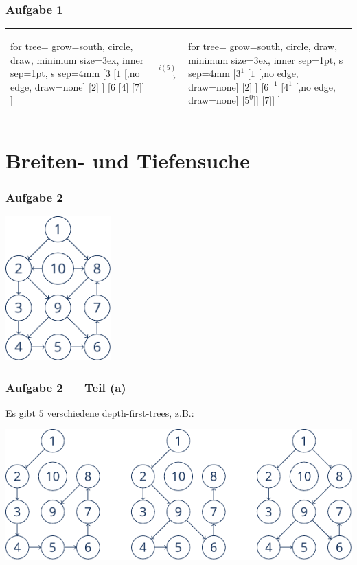\documentclass{beamer}
\begin{document}
\begin{frame} \frametitle{Aufgabe 1}
	\centering
	\begin{tabularx}{\linewidth}{m{3.5cm} m{.5cm} m{3.5cm}}
		\begin{forest}
			for tree={ grow=south, circle, draw, minimum size=3ex, inner sep=1pt, s sep=4mm }
			[$3$ [$1$ [,no edge, draw=none] [$2$] ] [$6$ [$4$] [$7$]] ]
		\end{forest}
		&
		$\overset{i(5)}{\longrightarrow}$
		&
		\begin{forest}
			for tree={ grow=south, circle, draw, minimum size=3ex, inner sep=1pt, s sep=4mm }
			[$3^1$ [$1$ [,no edge, draw=none] [$2$] ] [$6^{-1}$ [$4^1$ [,no edge, draw=none] [$5^0$]] [$7$]] ]
		\end{forest}
	\end{tabularx}
\end{frame}


\section{Breiten- und Tiefensuche}

\begin{frame} \frametitle{Aufgabe 2}
	\centering
	\includegraphics[height=15em]{./tut11_task2-graph.pdf}
\end{frame}

\begin{frame} \frametitle{Aufgabe 2 --- Teil (a)}
	Es gibt $5$ verschiedene depth-first-trees, z.B.:
	
	\includegraphics[width=\linewidth]{./tut11_task2-dft.pdf}
\end{frame}
\end{document}
